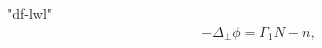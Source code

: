 "df-lwl"
\begin{subequations}
\begin{align}
 -\Delta_{\perp} \phi =  \Gamma_1 N -n, 
\end{align}
\end{subequations}


